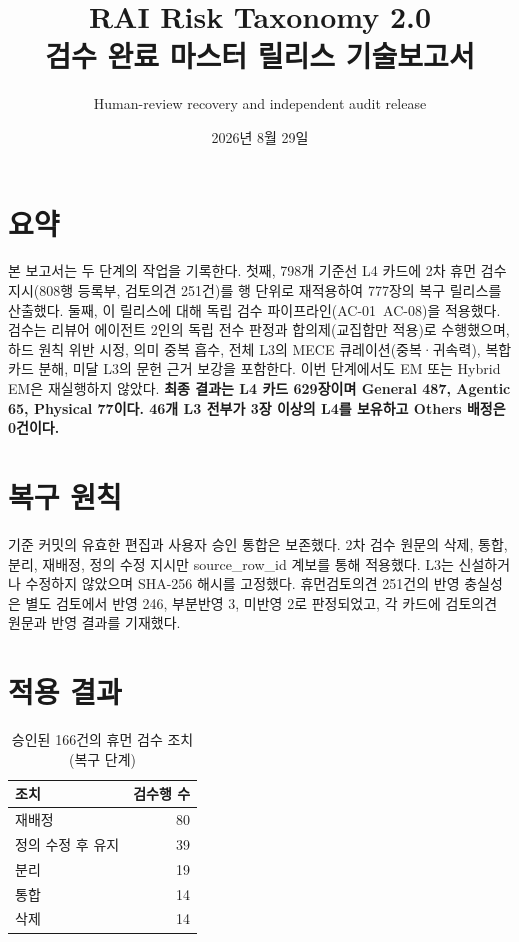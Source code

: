 \documentclass[11pt,a4paper]{article}
\begin{document}
\title{RAI Risk Taxonomy 2.0\\검수 완료 마스터 릴리스 기술보고서}\author{Human-review recovery and independent audit release}\date{2026년 8월 29일}\maketitle
\par\section*{요약}
본 보고서는 두 단계의 작업을 기록한다. 첫째, 798개 기준선 L4 카드에 2차 휴먼 검수 지시(808행 등록부, 검토의견 251건)를 행 단위로 재적용하여 777장의 복구 릴리스를 산출했다. 둘째, 이 릴리스에 대해 독립 검수 파이프라인(AC-01~AC-08)을 적용했다. 검수는 리뷰어 에이전트 2인의 독립 전수 판정과 합의제(교집합만 적용)로 수행했으며, 하드 원칙 위반 시정, 의미 중복 흡수, 전체 L3의 MECE 큐레이션(중복·귀속력), 복합 카드 분해, 미달 L3의 문헌 근거 보강을 포함한다. 이번 단계에서도 EM 또는 Hybrid EM은 재실행하지 않았다. \textbf{최종 결과는 L4 카드 629장이며 General 487, Agentic 65, Physical 77이다. 46개 L3 전부가 3장 이상의 L4를 보유하고 Others 배정은 0건이다.}
\par\section{복구 원칙}
기준 커밋의 유효한 편집과 사용자 승인 통합은 보존했다. 2차 검수 원문의 삭제, 통합, 분리, 재배정, 정의 수정 지시만 source\_row\_id 계보를 통해 적용했다. L3는 신설하거나 수정하지 않았으며 SHA-256 해시를 고정했다. 휴먼검토의견 251건의 반영 충실성은 별도 검토에서 반영 246, 부분반영 3, 미반영 2로 판정되었고, 각 카드에 검토의견 원문과 반영 결과를 기재했다.
\par\section{적용 결과}
\begin{table}[h]\centering\begin{tabular}{lr}\toprule 조치 & 검수행 수\\\midrule 재배정 & 80\\정의 수정 후 유지 & 39\\분리 & 19\\통합 & 14\\삭제 & 14\\\bottomrule\end{tabular}\caption{승인된 166건의 휴먼 검수 조치(복구 단계)}\end{table}
\end{document}
